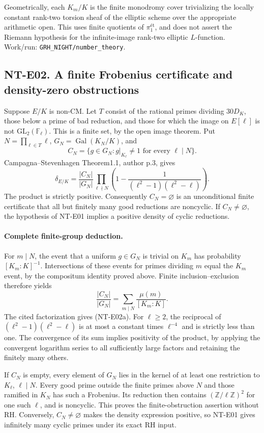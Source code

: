 Geometrically, each $K_m/K$ is the finite monodromy cover trivializing
the locally constant rank-two torsion sheaf of the elliptic scheme
over the appropriate arithmetic open. This uses finite quotients of
$\pi_1^{\text{ét}}$, and does not assert the Riemann hypothesis for
the infinite-image rank-two elliptic $L$-function. Work/run:
\texttt{GRH\_NIGHT/number\_theory}.

\subsection*{NT-E02. A finite Frobenius certificate and density-zero obstructions}
Suppose $E/K$ is non-CM. Let $T$ consist of the rational primes
dividing $30D_K$, those below a prime of bad reduction, and those for
which the image on $E[\ell]$ is not $\mathrm{GL}_2(\mathbb F_\ell)$.
This is a finite set, by the open image theorem. Put
$N=\prod_{\ell\in T}\ell$, $G_N=\operatorname{Gal}(K_N/K)$, and
\[
 C_N=\{g\in G_N:g|_{K_\ell}\ne1\text{ for every }\ell\mid N\}.
\]
Campagna--Stevenhagen Theorem1.1, author p.3, gives
\[
 \delta_{E/K}=\frac{|C_N|}{|G_N|}
   \prod_{\ell\nmid N}
       \left(1-\frac1{(\ell^2-1)(\ell^2-\ell)}\right).       \tag{NT-E02a}
\]
The product is strictly positive. Consequently $C_N=\varnothing$
is an unconditional finite certificate that all but finitely many
good reductions are noncyclic. If $C_N\ne\varnothing$, the hypothesis
of NT-E01 implies a positive density of cyclic reductions.

\paragraph{Complete finite-group deduction.}
For $m\mid N$, the event that a uniform $g\in G_N$ is trivial on
$K_m$ has probability $[K_m:K]^{-1}$. Intersections of these events
for primes dividing $m$ equal the $K_m$ event, by the compositum
identity proved above. Finite inclusion--exclusion therefore yields
\[
 \frac{|C_N|}{|G_N|}=\sum_{m\mid N}\frac{\mu(m)}{[K_m:K]}.
\]
The cited factorization gives (NT-E02a). For $\ell\ge2$, the
reciprocal of $(\ell^2-1)(\ell^2-\ell)$ is at most a constant
times $\ell^{-4}$ and is strictly less than one. The convergence
of its sum implies positivity of the product, by applying the
convergent logarithm series to all sufficiently large factors and
retaining the finitely many others.

If $C_N$ is empty, every element of $G_N$ lies in the kernel of at
least one restriction to $K_\ell$, $\ell\mid N$. Every good prime
outside the finite primes above $N$ and those ramified in $K_N$ has
such a Frobenius. Its reduction then contains
$(\mathbb Z/\ell\mathbb Z)^2$ for one such $\ell$, and is noncyclic.
This proves the finite-obstruction assertion without RH. Conversely,
$C_N\ne\varnothing$ makes the density expression positive, so NT-E01
gives infinitely many cyclic primes under its exact RH input.

